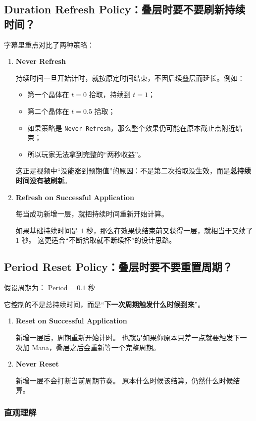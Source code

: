 \subsection{Duration Refresh Policy：叠层时要不要刷新持续时间？}

字幕里重点对比了两种策略：
\begin{enumerate}
	\item \textbf{Never Refresh}
	
	持续时间一旦开始计时，就按原定时间结束，不因后续叠层而延长。例如：
	\begin{itemize}
		\item 第一个晶体在 $t=0$ 拾取，持续到 $t=1$；
		\item 第二个晶体在 $t=0.5$ 拾取；
		\item 如果策略是 \texttt{Never Refresh}，那么整个效果仍可能在原本截止点附近结束；
		\item 所以玩家无法拿到完整的“两秒收益”。
	\end{itemize}
	
	这正是视频中“没能涨到预期值”的原因：不是第二次拾取没生效，而是\textbf{总持续时间没有被刷新}。
	
	\item \textbf{Refresh on Successful Application}
	
	每当成功新增一层，就把持续时间重新开始计算。
	
	如果基础持续时间是 $1$ 秒，那么在效果快结束前又获得一层，就相当于又续了 $1$ 秒。  
	这更适合“不断拾取就不断续杯”的设计思路。
\end{enumerate}
\subsection{Period Reset Policy：叠层时要不要重置周期？}

假设周期为：
$
\text{Period} = 0.1\text{ 秒}
$

它控制的不是总持续时间，而是“\textbf{下一次周期触发什么时候到来}”。
\begin{enumerate}
	\item \textbf{Reset on Successful Application}
	
	新增一层后，周期重新开始计时。  
	也就是如果你原本只差一点就要触发下一次加 Mana，叠层之后会重新等一个完整周期。
	
	\item \textbf{Never Reset}
	
	新增一层不会打断当前周期节奏。  
	原本什么时候该结算，仍然什么时候结算。
\end{enumerate}
\subsubsection{直观理解}


